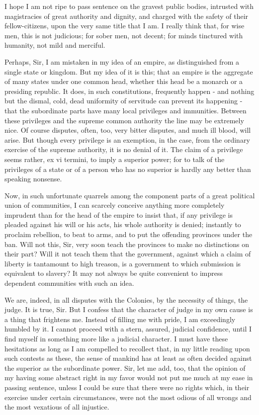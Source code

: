 I hope I am not ripe to pass sentence on the gravest public bodies, intrusted with magistracies of great authority and dignity, and charged with the safety of their fellow-citizens, upon the very same title that I am. I really think that, for wise men, this is not judicious; for sober men, not decent; for minds tinctured with humanity, not mild and merciful.\par

Perhaps, Sir, I am mistaken in my idea of an empire, as distinguished from a single state or kingdom. But my idea of it is this; that an empire is the aggregate of many states under one common head, whether this head be a monarch or a presiding republic. It does, in such constitutions, frequently happen - and nothing but the dismal, cold, dead uniformity of servitude can prevent its happening - that the subordinate parts have many local privileges and immunities. Between these privileges and the supreme common authority the line may be extremely nice. Of course disputes, often, too, very bitter disputes, and much ill blood, will arise. But though every privilege is an exemption, in the case, from the ordinary exercise of the supreme authority, it is no denial of it. The claim of a privilege seems rather, ex vi termini, to imply a superior power; for to talk of the privileges of a state or of a person who has no superior is hardly any better than speaking nonsense.\par

Now, in such unfortunate quarrels among the component parts of a great political union of communities, I can scarcely conceive anything more completely imprudent than for the head of the empire to insist that, if any privilege is pleaded against his will or his acts, his whole authority is denied; instantly to proclaim rebellion, to beat to arms, and to put the offending provinces under the ban. Will not this, Sir, very soon teach the provinces to make no distinctions on their part? Will it not teach them that the government, against which a claim of liberty is tantamount to high treason, is a government to which submission is equivalent to slavery? It may not always be quite convenient to impress dependent communities with such an idea.\par

We are, indeed, in all disputes with the Colonies, by the necessity of things, the judge. It is true, Sir. But I confess that the character of judge in my own cause is a thing that frightens me. Instead of filling me with pride, I am exceedingly humbled by it. I cannot proceed with a stern, assured, judicial confidence, until I find myself in something more like a judicial character. I must have these hesitations as long as I am compelled to recollect that, in my little reading upon such contests as these, the sense of mankind has at least as often decided against the superior as the subordinate power. Sir, let me add, too, that the opinion of my having some abstract right in my favor would not put me much at my ease in passing sentence, unless I could be sure that there were no rights which, in their exercise under certain circumstances, were not the most odious of all wrongs and the most vexatious of all injustice.\par

